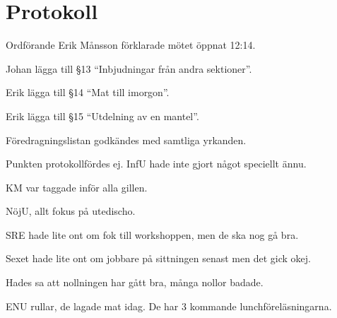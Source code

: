 \documentclass[10pt]{article}
\def\mo{Erik Månsson}
\begin{document}
\section*{Protokoll}
\begin{paragrafer}
Ordförande {\mo} förklarade mötet öppnat 12:14.

{\valavmo}

{\valavms}

{\valavj}

{\tosg}

{\ingaadj}

\newpage
{}
Johan \ypa lägga till \S13 ``Inbjudningar från andra sektioner''.

Erik \ypa lägga till \S14 ``Mat till imorgon''.

Erik \ypa lägga till \S15 ``Utdelning av en mantel''.

Föredragningslistan godkändes med samtliga yrkanden.
\ingaprot

\begin{fyllnadsval} %
\end{fyllnadsval}

\begin{paragrafer}
Punkten protokollfördes ej.
InfU hade inte gjort något speciellt ännu.

KM var taggade inför alla gillen.

NöjU, allt fokus på utedischo.

SRE hade lite ont om fok till workshoppen, men de ska nog gå bra.

Sexet hade lite ont om jobbare på sittningen senast men det gick okej.

Hades sa att nollningen har gått bra, många nollor badade.

ENU rullar, de lagade mat idag. De har 3 kommande lunchföreläsningarna.


\end{paragrafer}
\end{paragrafer}
\end{document}
